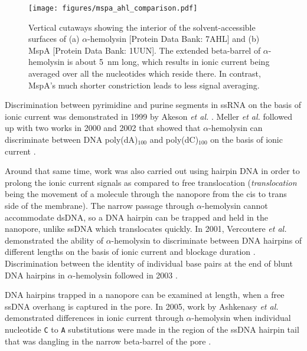 \begin{figure}[h]
\begin{centering}
\texttt{[image: figures/mspa\_ahl\_comparison.pdf]}
\caption[Comparison between geometries of MspA and $\alpha$-hemolysin]{Vertical cutaways showing the interior of the solvent-accessible surfaces of (a) $\alpha$-hemolysin [Protein Data Bank: 7AHL] and (b) MspA [Protein Data Bank: 1UUN].  The extended beta-barrel of $\alpha$-hemolysin is about \SI{5}{nm} long, which results in ionic current being averaged over all the nucleotides which reside there.  In contrast, MspA's much shorter constriction leads to less signal averaging.}
\label{fig:mspa_ahl}
\end{centering}
\end{figure}

Discrimination between pyrimidine and purine segments in ssRNA on the basis of ionic current was demonstrated in 1999 by Akeson \textit{et al.} \citep{Akeson1999}.  Meller \textit{et al.} followed up with two works in 2000 and 2002 that showed that $\alpha$-hemolysin can discriminate between DNA poly(dA)$_{100}$ and poly(dC)$_{100}$ on the basis of ionic current \citep{Meller2000, Meller2002}.

Around that same time, work was also carried out using hairpin DNA in order to prolong the ionic current signals as compared to free translocation (\textit{translocation} being the movement of a molecule through the nanopore from the cis to trans side of the membrane).  The narrow passage through $\alpha$-hemolysin cannot accommodate dsDNA, so a DNA hairpin can be trapped and held in the nanopore, unlike ssDNA which translocates quickly.  In 2001, Vercoutere \textit{et al.} demonstrated the ability of $\alpha$-hemolysin to discriminate between DNA hairpins of different lengths on the basis of ionic current and blockage duration \citep{Vercoutere2001}.  Discrimination between the identity of individual base pairs at the end of blunt DNA hairpins in $\alpha$-hemolysin followed in 2003 \citep{Vercoutere2003}.

DNA hairpins trapped in a nanopore can be examined at length, when a free ssDNA overhang is captured in the pore.  In 2005, work by Ashkenasy \textit{et al.} demonstrated differences in ionic current through $\alpha$-hemolysin when individual nucleotide \texttt{C} to \texttt{A} substitutions were made in the region of the ssDNA hairpin tail that was dangling in the narrow beta-barrel of the pore \citep{Ashkenasy2005}.

